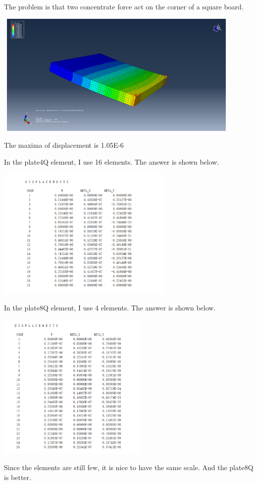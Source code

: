 \documentclass[UTF8]{ctexbook}
\begin{document}
    The problem is that two concentrate force act on the corner of a square board.
        \begin{center}
            \includegraphics[width=12cm,height=6cm]{abaqus.pdf}
        \end{center}
    The maxima of displacement is 1.05E-6
    
    In the plate4Q element, I use 16 elements. The answer is shown below.
        \begin{center}
            \includegraphics[width=8.55cm,height=6.41cm]{plate8Q_appl.pdf}
        \end{center}
    In the plate8Q element, I use 4 elements. The answer is shown below.
        \begin{center}
            \includegraphics[width=7.23cm,height=7.15cm]{plate4Q_appl.pdf}
        \end{center}
    Since the elements are still few, it is nice to have the same scale. And the plate8Q is better.
\end{document}
